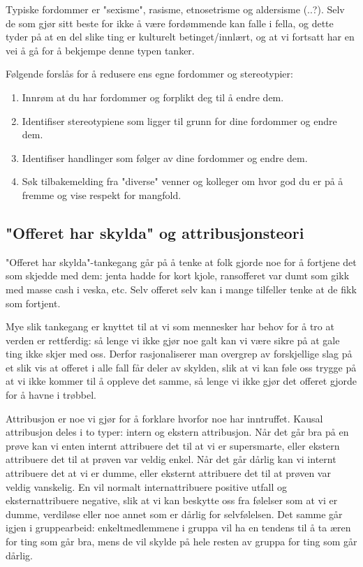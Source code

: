 \documentclass[11pt]{article}
\begin{document}
			Typiske fordommer er "sexisme", rasisme, etnosetrisme og aldersisme (..?). Selv de som gjør sitt beste for ikke å være fordømmende kan falle i fella, og dette tyder på at en del slike ting er kulturelt betinget/innlært, og at vi fortsatt har en vei å gå for å bekjempe denne typen tanker.
			
			Følgende forslås for å redusere ens egne fordommer og stereotypier:
			\begin{enumerate}
				\item Innrøm at du har fordommer og forplikt deg til å endre dem.
				\item Identifiser stereotypiene som ligger til grunn for dine fordommer og endre dem.
				\item Identifiser handlinger som følger av dine fordommer og endre dem.
				\item Søk tilbakemelding fra "diverse" venner og kolleger om hvor god du er på å fremme og vise respekt for mangfold.
			\end{enumerate}
			
		\subsection{"Offeret har skylda" og attribusjonsteori}
			"Offeret har skylda"-tankegang går på å tenke at folk gjorde noe for å fortjene det som skjedde med dem: jenta hadde for kort kjole, ransofferet var dumt som gikk med masse cash i veska, etc. Selv offeret selv kan i mange tilfeller tenke at de fikk som fortjent. 
			
			Mye slik tankegang er knyttet til at vi som mennesker har behov for å tro at verden er rettferdig: så lenge vi ikke gjør noe galt kan vi være sikre på at gale ting ikke skjer med oss. Derfor rasjonaliserer man overgrep av forskjellige slag på et slik vis at offeret i alle fall får deler av skylden, slik at vi kan føle oss trygge på at vi ikke kommer til å oppleve det samme, så lenge vi ikke gjør det offeret gjorde for å havne i trøbbel.
			
			Attribusjon er noe vi gjør for å forklare hvorfor noe har inntruffet. Kausal attribusjon deles i to typer: intern og ekstern attribusjon. Når det går bra på en prøve kan vi enten internt attribuere det til at vi er supersmarte, eller ekstern attribuere det til at prøven var veldig enkel. Når det går dårlig kan vi internt attribuere det at vi er dumme, eller eksternt attribuere det til at prøven var veldig vanskelig. En vil normalt internattribuere positive utfall og eksternattribuere negative, slik at vi kan beskytte oss fra følelser som at vi er dumme, verdiløse eller noe annet som er dårlig for selvfølelsen. Det samme går igjen i gruppearbeid: enkeltmedlemmene i gruppa vil ha en tendens til å ta æren for ting som går bra, mens de vil skylde på hele resten av gruppa for ting som går dårlig.
			
\end{document}
